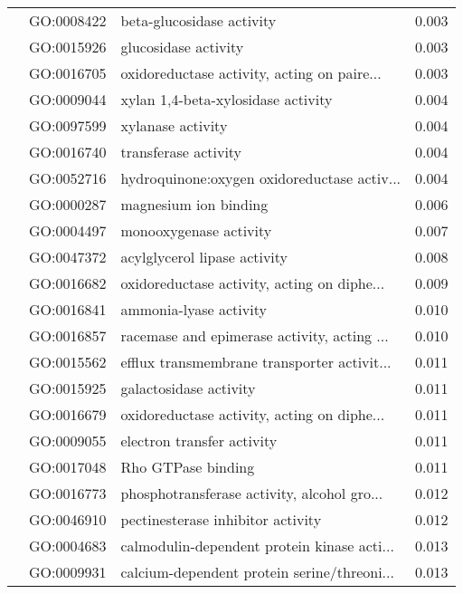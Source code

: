 \begin{longtable}{lllr}
   & GO:0008422 &                    beta-glucosidase activity &         0.003 \\
   & GO:0015926 &                         glucosidase activity &         0.003 \\
   & GO:0016705 &  oxidoreductase activity, acting on paire... &         0.003 \\
   & GO:0009044 &           xylan 1,4-beta-xylosidase activity &         0.004 \\
   & GO:0097599 &                            xylanase activity &         0.004 \\
   & GO:0016740 &                         transferase activity &         0.004 \\
   & GO:0052716 &  hydroquinone:oxygen oxidoreductase activ... &         0.004 \\
   & GO:0000287 &                        magnesium ion binding &         0.006 \\
   & GO:0004497 &                       monooxygenase activity &         0.007 \\
   & GO:0047372 &                 acylglycerol lipase activity &         0.008 \\
   & GO:0016682 &  oxidoreductase activity, acting on diphe... &         0.009 \\
   & GO:0016841 &                       ammonia-lyase activity &         0.010 \\
   & GO:0016857 &  racemase and epimerase activity, acting ... &         0.010 \\
   & GO:0015562 &  efflux transmembrane transporter activit... &         0.011 \\
   & GO:0015925 &                       galactosidase activity &         0.011 \\
   & GO:0016679 &  oxidoreductase activity, acting on diphe... &         0.011 \\
   & GO:0009055 &                   electron transfer activity &         0.011 \\
   & GO:0017048 &                           Rho GTPase binding &         0.011 \\
   & GO:0016773 &  phosphotransferase activity, alcohol gro... &         0.012 \\
   & GO:0046910 &            pectinesterase inhibitor activity &         0.012 \\
   & GO:0004683 &  calmodulin-dependent protein kinase acti... &         0.013 \\
   & GO:0009931 &  calcium-dependent protein serine/threoni... &         0.013 \\

\end{longtable}
